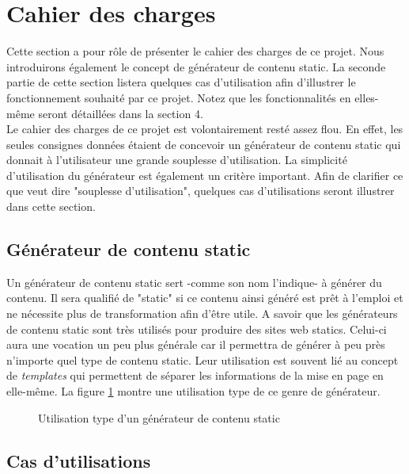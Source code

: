 \section{Cahier des charges}

	Cette section a pour rôle de présenter le cahier des charges de ce projet. Nous introduirons également le concept de générateur de contenu static. La seconde partie de cette section listera quelques cas d'utilisation afin d'illustrer le fonctionnement souhaité par ce projet. Notez que les fonctionnalités en elles-même seront détaillées dans la section 4.\\
	
	Le cahier des charges de ce projet est volontairement resté assez flou. En effet, les seules consignes données étaient de concevoir un générateur de contenu static qui donnait à l'utilisateur une grande souplesse d'utilisation. La simplicité d'utilisation du générateur est également un critère important. Afin de clarifier ce que veut dire "souplesse d'utilisation", quelques cas d'utilisations seront illustrer dans cette section.\\
	
	
	\subsection{Générateur de contenu static}
	
		Un générateur de contenu static sert -comme son nom l'indique- à générer du contenu. Il sera qualifié de "static" si ce contenu ainsi généré est prêt à l'emploi et ne nécessite plus de transformation afin d'être utile. A savoir que les générateurs de contenu static sont très utilisés pour produire des sites web statics. Celui-ci aura une vocation un peu plus générale car il permettra de générer à peu près n'importe quel type de contenu static. Leur utilisation est souvent lié au concept de \textit{templates} qui permettent de séparer les informations de la mise en page en elle-même. La figure \ref{fig:use_of_generator} montre une utilisation type de ce genre de générateur.\\
		
		\begin{figure}
			\label{fig:use_of_generator}
			\begin{center}
			\caption{Utilisation type d'un générateur de contenu static}
			\end{center}
		\end{figure}

	\subsection{Cas d'utilisations}
	
	